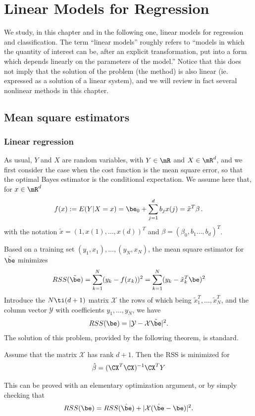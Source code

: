 




\chapter{Linear Models for Regression}
We study, in this chapter and in the following one, linear models for regression and
classification. The  term ``linear models'' roughly refers to ``models in which the quantity of
interest can be, after an explicit transformation, put into a form
which depends linearly on the parameters of the model.'' Notice that
this does not imply that the solution of the problem (the method) is
also linear (ie. expressed as a solution of a linear system), and we
will review in fact several nonlinear methods in this chapter. 



\section{Mean square estimators}
\subsection{Linear regression}
As usual, $Y$ and $X$ are random variables, with $Y\in \mR$ and
$X\in\mR^d$, and  we first consider  the case when the cost function is
the mean square error, so that the optimal Bayes estimator is the
conditional expectation. We assume here that, for $x\in\mR^d$
$$
f(x) := E(Y|X=x) = \be_0 + \sum_{j=1}^d b_j x(j) = \tilde x^T \beta\,.
$$
with the notation $\tilde   x = (1, x(1), \ldots, x(d))^T$ and $\beta =
(\beta_0, b_1\ldots, b_d)^T$.

Based on a training set $(y_1, x_1), \ldots, (y_N, x_N)$, the mean
square estimator for $\tilde\be$ minimizes
$$
RSS(\tilde\be) = \sum_{k=1}^N (y_k - f(x_k))^2  = \sum_{k=1}^N (y_k - \tilde
x_k^T \be)^2 
$$
Introduce the $N\ti (d+1)$ matrix $\mathcal X$ the rows of which
being $\tilde x_1^T, \ldots, \tilde x_N^T$, and the column vector
$\mathcal Y$ with coefficients $y_1, \ldots, y_N$, we have
$$
RSS(\be) = |\mathcal Y - \mathcal X \tilde\be|^2.
$$
The solution of this problem, provided by the following theorem, is
standard.
\begin{theorem}
\label{th:ls.reg}
Assume that the matrix $\mathcal X$ has rank $d+1$. Then the RSS is
minimized for 
$$
\hat \beta = (\CX^T\CX)^{-1} \CX^T Y
$$
\end{theorem}
This can be proved with an elementary optimization argument, or by simply
checking that
$$
RSS(\be) = RSS(\hat\be) + |\mathcal X(\hat\be - \be)|^2.
$$


